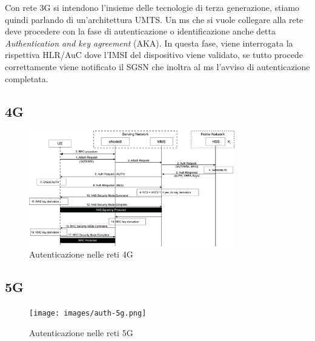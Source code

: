 Con rete 3G si intendono l'insieme delle tecnologie di terza generazione, stiamo quindi parlando di un'architettura UMTS.
Un \acrshort{ms} che si vuole collegare alla rete deve procedere con la fase di autenticazione o identificazione anche detta \textit{Authentication and key agreement}
(AKA). In questa fase, viene interrogata la rispettiva HLR/AuC dove l'IMSI del dispositivo viene validato, se tutto procede correttamente
viene notificato il SGSN che inoltra al \acrshort{ms} l'avviso di autenticazione completata.

\clearpage

\subsection{4G}
\begin{figure}[ht]
    \centering
    \includegraphics[width=0.8\textwidth]{images/auth-4g.png}
    \caption{Autenticazione nelle reti 4G}
\end{figure}
\clearpage

\subsection{5G}

\begin{figure}[ht]
    \centering
    \texttt{[image: images/auth-5g.png]}
    \caption{Autenticazione nelle reti 5G}
\end{figure}